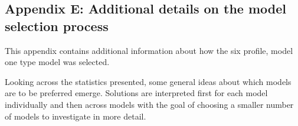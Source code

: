 \documentclass[]{msu-thesis}
\theoremstyle{definition}
\theoremstyle{definition}
\theoremstyle{definition}
\theoremstyle{remark}
\begin{document}
\subsection{Appendix E: Additional details on the model selection
process}\label{appendix-e-additional-details-on-the-model-selection-process}

This appendix contains additional information about how the six profile,
model one type model was selected.

Looking across the statistics presented, some general ideas about which
models are to be preferred emerge. Solutions are interpreted first for
each model individually and then across models with the goal of choosing
a smaller number of models to investigate in more detail.

\begin{landscape}\begin{table}


\end{table}
\end{landscape}
\end{document}
